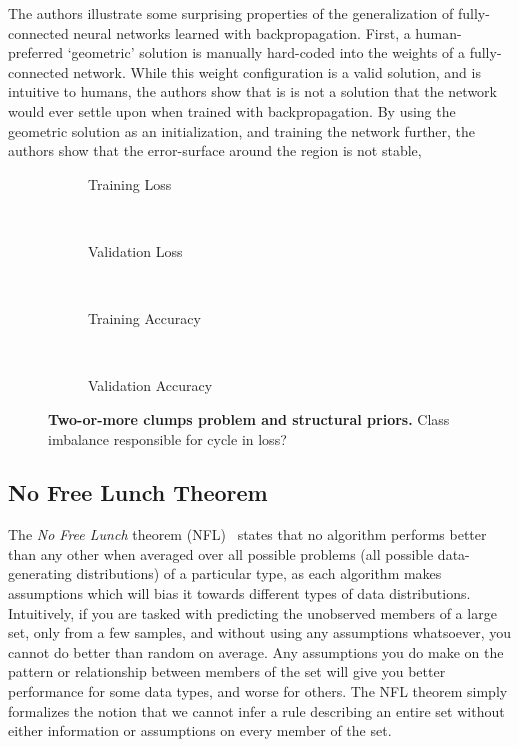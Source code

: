 \documentclass[thesis]{subfiles}
\begin{document}
	The authors illustrate some surprising properties of the generalization of fully-connected neural networks learned with backpropagation. First, a human-preferred `geometric' solution is manually hard-coded into the weights of a fully-connected network. While this weight configuration is a valid solution, and is intuitive to humans, the authors show that is is not a solution that the network would ever settle upon when trained with backpropagation. By using the geometric solution as an initialization, and training the network further, the authors show that the error-surface around the region is not stable,
	
	\begin{figure}[tb]
		\centering
		\begin{subfigure}[t]{0.49\textwidth}
			\resizebox{\linewidth}{!}{}
			\caption{Training Loss}
			\label{fig:tomplotmintrainloss}
		\end{subfigure}
		~
		\begin{subfigure}[t]{0.49\textwidth}
			\resizebox{\linewidth}{!}{}
			\caption{Validation Loss}
			\label{fig:tomplotminvalloss}
		\end{subfigure}\\
		\begin{subfigure}[t]{0.49\textwidth}
			\resizebox{\linewidth}{!}{}
			\caption{Training Accuracy}
			\label{fig:tomplotmaxtrainacc}
		\end{subfigure}
		~
		\begin{subfigure}[t]{0.49\textwidth}
			\resizebox{\linewidth}{!}{}
			\caption{Validation Accuracy}
			\label{fig:tomplotmaxvalacc}
		\end{subfigure}
		\caption[Two-or-more clumps problem and structural priors.]{\textbf{Two-or-more clumps problem and structural priors.} Class imbalance responsible for cycle in loss?}
		\label{fig:tomplot}
	\end{figure}

\subsection{No Free Lunch Theorem}
\label{nofreelunch}
The \emph{No Free Lunch} theorem (NFL)~\citep{wolpert1996lack} states that no algorithm performs better than any other when averaged over all possible problems (\ie all possible data-generating distributions) of a particular type, as each algorithm makes assumptions which will bias it towards different types of data distributions. Intuitively, if you are tasked with predicting the unobserved members of a large set, only from a few samples, and without using any assumptions whatsoever, you cannot do better than random on average. Any assumptions you do make on the pattern or relationship between members of the set will give you better performance for some data types, and worse for others. The NFL theorem simply formalizes the notion that we cannot infer a rule describing an entire set without either information or assumptions on every member of the set.
\end{document}
